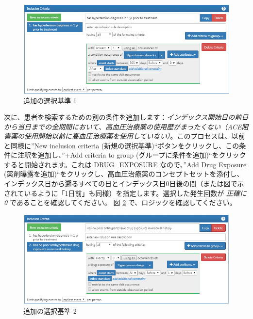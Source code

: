 \documentclass[
  11pt]{book}
\theoremstyle{definition}
\theoremstyle{definition}
\theoremstyle{definition}
\theoremstyle{definition}
\theoremstyle{remark}
\begin{document}
\begin{figure}

{\centering \includegraphics[width=1\linewidth]{images/Cohorts/ATLAS-IC1} 

}

\caption{追加の選択基準 1}\label{fig:ATLASIC1}
\end{figure}

次に、患者を検索するための別の条件を追加します：\emph{インデックス開始日の前日から当日までの全期間において、高血圧治療薬の使用歴がまったくない（ACE阻害薬の使用開始以前に高血圧治療薬を使用していない）}。このプロセスは、以前と同様に''New inclusion criteria (新規の選択基準)``ボタンをクリックし、この条件に注釈を追加し、''+Add criteria to group (グループに条件を追加)``をクリックすると開始されます。これは DRUG\_EXPOSURE なので、''Add Drug Exposure (薬剤曝露を追加)``をクリックし、高血圧治療薬のコンセプトセットを添付し、インデックス日から遡るすべての日とインデックス日0日後の間（または図で示されているように「1日前」も同様）を指定します。選択した発生回数が \emph{正確に 0} であることを確認してください。 図 \ref{fig:ATLASIC2} で、ロジックを確認してください。

\begin{figure}

{\centering \includegraphics[width=1\linewidth]{images/Cohorts/ATLAS-IC2} 

}

\caption{追加の選択基準 2}\label{fig:ATLASIC2}
\end{figure}
\end{document}
